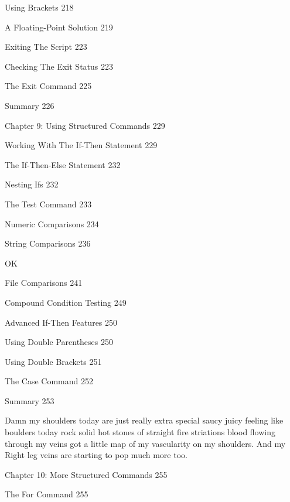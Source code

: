 Using Brackets 218



A Floating-Point Solution 219



Exiting The Script 223



Checking The Exit Status 223



The Exit Command 225



Summary 226



Chapter 9: Using Structured Commands 229



Working With The If-Then Statement 229



The If-Then-Else Statement 232



Nesting Ifs 232



The Test Command 233



Numeric Comparisons 234



String Comparisons 236

OK

File Comparisons 241



Compound Condition Testing 249



Advanced If-Then Features 250



Using Double Parentheses 250



Using Double Brackets 251



The Case Command 252



Summary 253

Damn my shoulders today are just really extra special saucy juicy feeling like boulders today rock solid hot stones of straight fire striations blood flowing through my veins got a little map of my vascularity on my shoulders. And my Right leg veins are starting to pop much more too.

Chapter 10: More Structured Commands 255



The For Command 255



